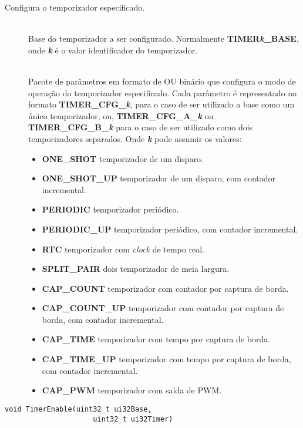 Configura o temporizador especificado.

\begin{description}
	\item []\hfill \\
	Base do temporizador a ser configurado. Normalmente \textbf{TIMER\emph{k}\_BASE}, onde \textbf{\emph{k}} é o valor identificador do temporizador.
	
	\item []\hfill \\
	Pacote de parâmetros em formato de OU binário que configura o modo de operação do temporizador especificado. Cada parâmetro é representado no formato \textbf{TIMER\_CFG\_\emph{k}}, para o caso de ser utilizado a base como um único temporizador, ou, \textbf{TIMER\_CFG\_A\_\emph{k}} ou \textbf{TIMER\_CFG\_B\_\emph{k}} para o caso de ser utilizado como dois temporizadores separados. Onde \textbf{\emph{k}} pode assumir os valores:
	\begin{itemize}
		\item \textbf{ONE\_SHOT} temporizador de um disparo.
		\item \textbf{ONE\_SHOT\_UP} temporizador de um disparo, com contador incremental.
		\item \textbf{PERIODIC} temporizador periódico.
		\item \textbf{PERIODIC\_UP} temporizador periódico, com contador incremental.
		\item \textbf{RTC} temporizador com \emph{clock} de tempo real.
		\item \textbf{SPLIT\_PAIR} dois temporizador de meia largura.
		\item \textbf{CAP\_COUNT} temporizador com contador por captura de borda.
		\item \textbf{CAP\_COUNT\_UP} temporizador com contador por captura de borda, com contador incremental.
		\item \textbf{CAP\_TIME} temporizador com tempo por captura de borda.
		\item \textbf{CAP\_TIME\_UP} temporizador com tempo por captura de borda, com contador incremental.
		\item \textbf{CAP\_PWM} temporizador com saída de PWM.
	\end{itemize}
\end{description}

\begin{lstlisting}[style=funcao]
	void TimerEnable(uint32_t ui32Base,
					 uint32_t ui32Timer)
\end{lstlisting}

